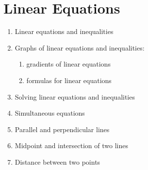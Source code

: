 
\chapter{Linear Equations}

\begin{enumerate}
\item Linear equations and inequalities

\item Graphs of linear equations and inequalities:
  \begin{enumerate}
  \item gradients of linear equations

  \item formulas for linear equations
  \end{enumerate}

\item Solving linear equations and inequalities

\item Simultaneous equations

\item Parallel and perpendicular lines

\item Midpoint and intersection of two lines

\item Distance between two points
\end{enumerate}

